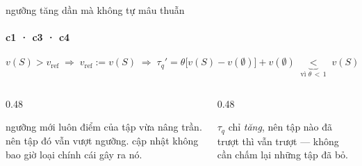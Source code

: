 \begin{frame}{ngưỡng tăng dần mà không tự mâu thuẫn}
  \framesubtitle{c1 · c3 · c4}

  \vspace{0.5em}
  \[
    v(S) > v_{\mathrm{ref}}
    \;\Longrightarrow\;
    v_{\mathrm{ref}} := v(S)
    \;\Longrightarrow\;
    \tau_q' = \theta\bigl[v(S) - v(\emptyset)\bigr] + v(\emptyset)
    \;\underbrace{<}_{\text{vì } \theta\,<\,1}\; v(S)
  \]

  \vspace{0.8em}
  \begin{columns}[t]
  \begin{column}{0.48\textwidth}
    \begin{keyb}[title={không, và $\theta < 1$ là lý do duy nhất}]
      ngưỡng mới luôn  điểm của tập vừa nâng trần. nên tập đó vẫn
      vượt ngưỡng. cập nhật không bao giờ loại chính cái gây ra nó.
    \end{keyb}
  \end{column}
  \begin{column}{0.48\textwidth}
    \begin{bx}[title={và không phải xét lại quá khứ}]
      $\tau_q$ chỉ \emph{tăng}, nên tập nào đã trượt thì vẫn trượt — không cần
      chấm lại những tập đã bỏ.
      \vspace{0.25em}

    \end{bx}
  \end{column}
  \end{columns}
\end{frame}
